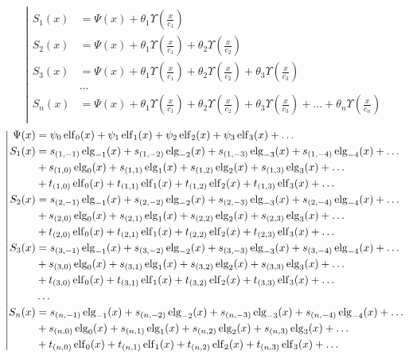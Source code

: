 %
\begin{equation*} \left| \begin{aligned}
S_1(x) &=
  \Psi(x)
+ \theta_1 \Upsilon{\left(\frac{x}{c_1} \right)} \\
%
S_2(x) &=
  \Psi(x)
+ \theta_1 \Upsilon{\left(\frac{x}{c_1} \right)}
+ \theta_2 \Upsilon{\left(\frac{x}{c_2} \right)} \\
%
S_3(x) &=
  \Psi(x)
+ \theta_1 \Upsilon{\left(\frac{x}{c_1} \right)}
+ \theta_2 \Upsilon{\left(\frac{x}{c_2} \right)}
+ \theta_3 \Upsilon{\left(\frac{x}{c_3} \right)} \\
%
&\ldots \\
%
S_n(x) &=
  \Psi(x)
+ \theta_1 \Upsilon{\left(\frac{x}{c_1} \right)}
+ \theta_2 \Upsilon{\left(\frac{x}{c_2} \right)}
+ \theta_3 \Upsilon{\left(\frac{x}{c_3} \right)}
+ \ldots
+ \theta_n \Upsilon{\left(\frac{x}{c_n} \right)} \\
\end{aligned} \right. \end{equation*}
%
\begin{equation*} \left| \begin{aligned}
\Psi(x) &=
  \psi_0 \elf_0(x)
+ \psi_1 \elf_1(x) 
+ \psi_2 \elf_2(x) 
+ \psi_3 \elf_3(x) 
+ \ldots \\
%
S_1(x) &= 
  s_{(1,-1)} \elg_{-1}(x)
+ s_{(1,-2)} \elg_{-2}(x)
+ s_{(1,-3)} \elg_{-3}(x)
+ s_{(1,-4)} \elg_{-4}(x)
+ \ldots \\ &
+ s_{(1,0)} \elg_0(x)
+ s_{(1,1)} \elg_1(x)
+ s_{(1,2)} \elg_2(x)
+ s_{(1,3)} \elg_3(x)
+ \ldots \\ &
+ t_{(1,0)} \elf_0(x)
+ t_{(1,1)} \elf_1(x)
+ t_{(1,2)} \elf_2(x)
+ t_{(1,3)} \elf_3(x)
+ \ldots \\
%
S_2(x) &= 
  s_{(2,-1)} \elg_{-1}(x)
+ s_{(2,-2)} \elg_{-2}(x)
+ s_{(2,-3)} \elg_{-3}(x)
+ s_{(2,-4)} \elg_{-4}(x)
+ \ldots \\ &
+ s_{(2,0)} \elg_0(x)
+ s_{(2,1)} \elg_1(x)
+ s_{(2,2)} \elg_2(x)
+ s_{(2,3)} \elg_3(x)
+ \ldots \\ &
+ t_{(2,0)} \elf_0(x)
+ t_{(2,1)} \elf_1(x)
+ t_{(2,2)} \elf_2(x)
+ t_{(2,3)} \elf_3(x)
+ \ldots \\
%
S_3(x) &= 
  s_{(3,-1)} \elg_{-1}(x)
+ s_{(3,-2)} \elg_{-2}(x)
+ s_{(3,-3)} \elg_{-3}(x)
+ s_{(3,-4)} \elg_{-4}(x)
+ \ldots \\ &
+ s_{(3,0)} \elg_0(x)
+ s_{(3,1)} \elg_1(x)
+ s_{(3,2)} \elg_2(x)
+ s_{(3,3)} \elg_3(x)
+ \ldots \\ &
+ t_{(3,0)} \elf_0(x)
+ t_{(3,1)} \elf_1(x)
+ t_{(3,2)} \elf_2(x)
+ t_{(3,3)} \elf_3(x)
+ \ldots \\
%
&\ldots \\
%
S_n(x) &= 
  s_{(n,-1)} \elg_{-1}(x)
+ s_{(n,-2)} \elg_{-2}(x)
+ s_{(n,-3)} \elg_{-3}(x)
+ s_{(n,-4)} \elg_{-4}(x)
+ \ldots \\ &
+ s_{(n,0)} \elg_0(x)
+ s_{(n,1)} \elg_1(x)
+ s_{(n,2)} \elg_2(x)
+ s_{(n,3)} \elg_3(x)
+ \ldots \\ &
+ t_{(n,0)} \elf_0(x)
+ t_{(n,1)} \elf_1(x)
+ t_{(n,2)} \elf_2(x)
+ t_{(n,3)} \elf_3(x)
+ \ldots \\
\end{aligned} \right. \end{equation*}

